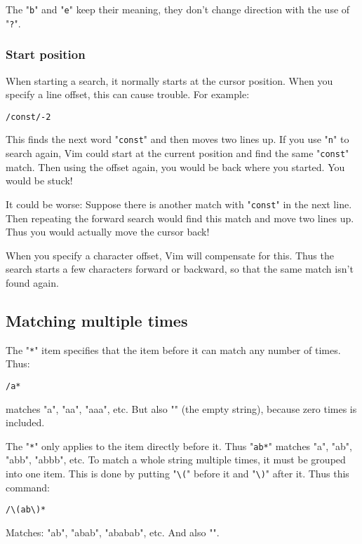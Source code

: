 The "\verb!b!" and "\verb!e!" keep their meaning, they don't change direction with the use of "\verb!?!".
\subsubsection{Start position}
When starting a search, it normally starts at the cursor position.
When you specify a line offset, this can cause trouble.
For example:

\begin{Verbatim}[samepage=true]
 /const/-2
\end{Verbatim}

This finds the next word "\verb!const!" and then moves two lines up.
If you use "\verb!n!" to search again, Vim could start at the current position and find the same "\verb!const!" match.
Then using the offset again, you would be back where you started.
You would be stuck!

It could be worse: Suppose there is another match with "\verb!const!" in the next line.
Then repeating the forward search would find this match and move two lines up.
Thus you would actually move the cursor back!

When you specify a character offset, Vim will compensate for this.
Thus the search starts a few characters forward or backward, so that the same match isn't found again.
\subsection{Matching multiple times}
The "\verb!*!" item specifies that the item before it can match any number of times.
Thus:

\begin{Verbatim}[samepage=true]
 /a*
\end{Verbatim}

matches "a", "aa", "aaa", etc.
But also "" (the empty string), because zero times is included.

The "\verb!*!" only applies to the item directly before it.
Thus "\verb!ab*!" matches "a", "ab", "abb", "abbb", etc.
To match a whole string multiple times, it must be grouped into one item.
This is done by putting "\verb!\(!" before it and "\verb!\)!" after it.
Thus this command:

\begin{Verbatim}[samepage=true]
 /\(ab\)*
\end{Verbatim}

Matches: "ab", "abab", "ababab", etc.  And also "".

